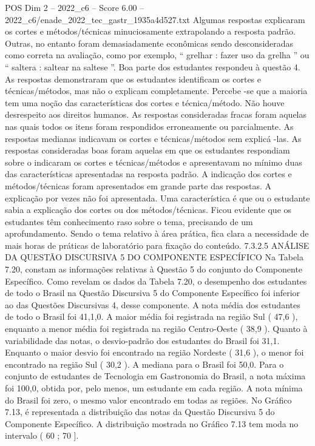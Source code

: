 \begin{textsample}{POS Dim 2 – 2022\_c6 – Score 6.00 – 2022\_c6/enade\_2022\_tec\_gastr\_1935a4d527.txt}
Algumas respostas explicaram os cortes e métodos/técnicas minuciosamente extrapolando a resposta padrão.
Outras, no entanto foram demasiadamente econômicas sendo desconsideradas como correta na avaliação, como por exemplo, “ grelhar : fazer uso da grelha ” ou “ saltera : saltear na saltese ”.
Boa parte dos estudantes respondeu à questão 4.
As respostas demonstraram que os estudantes identificam os cortes e técnicas/métodos, mas não o explicam completamente.
Percebe -se que a maioria tem uma noção das características dos cortes e técnica/método.
Não houve desrespeito aos direitos humanos.
As respostas consideradas fracas foram aquelas nas quais todos os itens foram respondidos erroneamente ou parcialmente.
As respostas medianas indicavam os cortes e técnicas/métodos sem explicá -las.
As respostas consideradas boas foram aquelas em que os estudantes respondiam sobre o indicaram os cortes e técnicas/métodos e apresentavam no mínimo duas das características apresentadas na resposta padrão.
A indicação dos cortes e métodos/técnicas foram apresentados em grande parte das respostas.
A explicação por vezes não foi apresentada.
Uma característica é que ou o estudante sabia a explicação dos cortes ou dos métodos/técnicas.
Ficou evidente que os estudantes têm conhecimento raso sobre o tema, precisando de um aprofundamento.
Sendo o tema relativo à área prática, fica clara a necessidade de mais horas de práticas de laboratório para fixação do conteúdo. 7.3.2.5 ANÁLISE DA QUESTÃO DISCURSIVA 5 DO COMPONENTE ESPECÍFICO Na Tabela 7.20, constam as informações relativas à Questão 5 do conjunto do Componente Específico.
Como revelam os dados da Tabela 7.20, o desempenho dos estudantes de todo o Brasil na Questão Discursiva 5 do Componente Específico foi inferior ao das Questões Discursivas 4, desse componente.
A nota média dos estudantes de todo o Brasil foi 41,1,0.
A maior média foi registrada na região Sul ( 47,6 ), enquanto a menor média foi registrada na região Centro-Oeste ( 38,9 ).
Quanto à variabilidade das notas, o desvio-padrão dos estudantes do Brasil foi 31,1.
Enquanto o maior desvio foi encontrado na região Nordeste ( 31,6 ), o menor foi encontrado na região Sul ( 30,2 ).
A mediana para o Brasil foi 50,0.
Para o conjunto de estudantes de Tecnologia em Gastronomia do Brasil, a nota máxima foi 100,0, obtida por, pelo menos, um estudante em cada região.
A nota mínima do Brasil foi zero, o mesmo valor encontrado em todas as regiões.
No Gráfico 7.13, é representada a distribuição das notas da Questão Discursiva 5 do Componente Específico.
A distribuição mostrada no Gráfico 7.13 tem moda no intervalo ( 60 ; 70 ].

\end{textsample}
